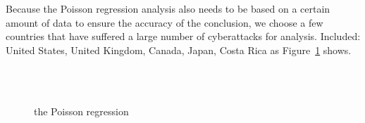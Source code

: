     Because the Poisson regression analysis also needs to be based on a certain amount of data to ensure the accuracy of the conclusion,
    we choose a few countries that have suffered a large number of cyberattacks for analysis.
    Included: United States, United Kingdom, Canada, Japan, Costa Rica as Figure~\ref{fig:the-poisson-regression} shows.
    \begin{figure}[htb]
        \centering
        \hfill
        \\
        \hfill
        \hfill
        \\
        \caption{the Poisson regression}\label{fig:the-poisson-regression}
    \end{figure}

